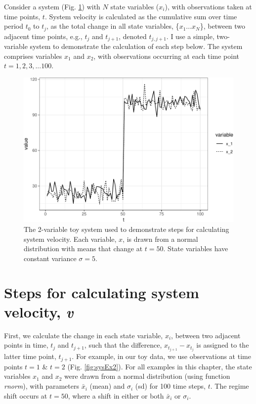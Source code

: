 \documentclass[12pt,twoside,openany]{reedthesis}
\begin{document}
Consider a system (Fig. \ref{fig:sysEx}) with \(N\) state variables (\(x_i\)), with observations taken at time points, \(t\). System velocity is calculated as the cumulative sum over time period \(t_0\) to \(t_j\), as the total change in all state variables, \{\(x_1 ...x_N\)\}, between two adjacent time points, e.g., \(t_j\) and \(t_{j+1}\), denoted \(t_{j,j+1}\). I use a simple, two-variable system to demonstrate the calculation of each step below. The system comprises variables \(x_1\) and \(x_2\), with observations occurring at each time point \(t = {1,2,3,...100}\).
\begin{figure}[h]

{\centering \includegraphics[width=0.95\linewidth]{_myDissertation_files/figure-latex/sysEx-1} 

}

\caption{The 2-variable toy system used to demonstrate steps for calculating system velocity. Each variable, $x$, is drawn from a normal distribution with means that change at $t = 50$. State variables have constant variance $\sigma = 5$. }\label{fig:sysEx}
\end{figure}
\hypertarget{steps-for-calculating-system-velocity-v}{%
\section{\texorpdfstring{Steps for calculating system velocity, \emph{v}}{Steps for calculating system velocity, v}}\label{steps-for-calculating-system-velocity-v}}

First, we calculate the change in each state variable, \(x_i\), between two adjacent points in time, \(t_j\) and \(t_{j+1}\), such that the difference, \(x_{t_{j+1}} - x_{t_j}\) is assigned to the latter time point, \(t_{j+1}\). For example, in our toy data, we use observations at time points \(t = 1\) \& \(t=2\) (Fig. \ref{fig:sysEx2}). For all examples in this chapter, the state variables \(x_1\) and \(x_2\) were drawn from a normal distribution (using function \emph{rnorm}), with parameters \(\bar{x}_i\) (mean) and \(\sigma_i\) (sd) for 100 time steps, \(t\). The regime shift occurs at \(t=50\), where a shift in either or both \(\bar{x}_i\) or \(\sigma_i\).
\end{document}
